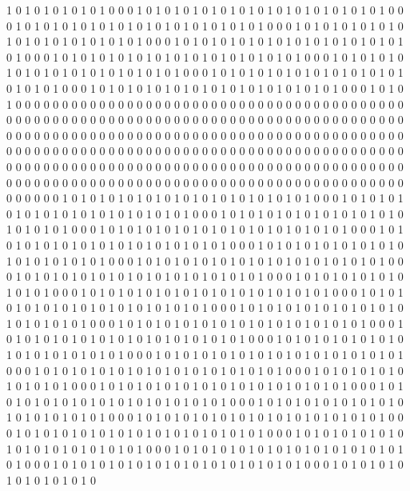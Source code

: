 1 0 1 0 1 0 1 0 1 0 1 0 0 0 1 0 1 0 1 0 1 0 1 0 1 0 1 0 1 0 1 0 1 0 1 0 1 0 1 0 1 0 0 0 1 0 1 0 1 0 1 0 1 0 1 0 1 0 1 0 1 0 1 0 1 0 1 0 1 0 1 0 0 0 1 0 1 0 1 0 1 0 1 0 1 0 1 0 1 0 1 0 1 0 1 0 1 0 1 0 1 0 0 0 1 0 1 0 1 0 1 0 1 0 1 0 1 0 1 0 1 0 1 0 1 0 1 0 1 0 1 0 0 0 1 0 1 0 1 0 1 0 1 0 1 0 1 0 1 0 1 0 1 0 1 0 1 0 1 0 1 0 0 0 1 0 1 0 1 0 1 0 1 0 1 0 1 0 1 0 1 0 1 0 1 0 1 0 1 0 1 0 0 0 1 0 1 0 1 0 1 0 1 0 1 0 1 0 1 0 1 0 1 0 1 0 1 0 1 0 1 0 0 0 1 0 1 0 1 0 1 0 1 0 1 0 1 0 1 0 1 0 1 0 1 0 1 0 1 0 1 0 0 0 1 0 1 0 1 0 
0 0 0 0 0 0 0 0 0 0 0 0 0 0 0 0 0 0 0 0 0 0 0 0 0 0 0 0 0 0 0 0 0 0 0 0 0 0 0 0 0 0 0 0 0 0 0 0 0 0 0 0 0 0 0 0 0 0 0 0 0 0 0 0 0 0 0 0 0 0 0 0 0 0 0 0 0 0 0 0 0 0 0 0 0 0 0 0 0 0 0 0 0 0 0 0 0 0 0 0 0 0 0 0 0 0 0 0 0 0 0 0 0 0 0 0 0 0 0 0 0 0 0 0 0 0 0 0 0 0 0 0 0 0 0 0 0 0 0 0 0 0 0 0 0 0 0 0 0 0 0 0 0 0 0 0 0 0 0 0 0 0 0 0 0 0 0 0 0 0 0 0 0 0 0 0 0 0 0 0 0 0 0 0 0 0 0 0 0 0 0 0 0 0 0 0 0 0 0 0 0 0 0 0 0 0 0 0 0 0 0 0 0 0 0 0 0 0 0 0 0 0 0 0 0 0 0 0 0 0 0 0 0 0 0 0 0 0 0 0 0 0 0 0 0 0 0 0 0 0 0 0 0 0 0 0 0 0 0 0 
0 0 1 0 1 0 1 0 1 0 1 0 1 0 1 0 1 0 1 0 1 0 1 0 1 0 1 0 1 0 0 0 1 0 1 0 1 0 1 0 1 0 1 0 1 0 1 0 1 0 1 0 1 0 1 0 1 0 1 0 0 0 1 0 1 0 1 0 1 0 1 0 1 0 1 0 1 0 1 0 1 0 1 0 1 0 1 0 1 0 0 0 1 0 1 0 1 0 1 0 1 0 1 0 1 0 1 0 1 0 1 0 1 0 1 0 1 0 1 0 0 0 1 0 1 0 1 0 1 0 1 0 1 0 1 0 1 0 1 0 1 0 1 0 1 0 1 0 1 0 0 0 1 0 1 0 1 0 1 0 1 0 1 0 1 0 1 0 1 0 1 0 1 0 1 0 1 0 1 0 0 0 1 0 1 0 1 0 1 0 1 0 1 0 1 0 1 0 1 0 1 0 1 0 1 0 1 0 1 0 0 0 1 0 1 0 1 0 1 0 1 0 1 0 1 0 1 0 1 0 1 0 1 0 1 0 1 0 1 0 0 0 1 0 1 0 1 0 1 0 1 0 1 0 1 0 1 0 1 0 
0 0 1 0 1 0 1 0 1 0 1 0 1 0 1 0 1 0 1 0 1 0 1 0 1 0 1 0 1 0 0 0 1 0 1 0 1 0 1 0 1 0 1 0 1 0 1 0 1 0 1 0 1 0 1 0 1 0 1 0 0 0 1 0 1 0 1 0 1 0 1 0 1 0 1 0 1 0 1 0 1 0 1 0 1 0 1 0 1 0 0 0 1 0 1 0 1 0 1 0 1 0 1 0 1 0 1 0 1 0 1 0 1 0 1 0 1 0 1 0 0 0 1 0 1 0 1 0 1 0 1 0 1 0 1 0 1 0 1 0 1 0 1 0 1 0 1 0 1 0 0 0 1 0 1 0 1 0 1 0 1 0 1 0 1 0 1 0 1 0 1 0 1 0 1 0 1 0 1 0 0 0 1 0 1 0 1 0 1 0 1 0 1 0 1 0 1 0 1 0 1 0 1 0 1 0 1 0 1 0 0 0 1 0 1 0 1 0 1 0 1 0 1 0 1 0 1 0 1 0 1 0 1 0 1 0 1 0 1 0 0 0 1 0 1 0 1 0 1 0 1 0 1 0 1 0 1 0 1 0 
0 0 1 0 1 0 1 0 1 0 1 0 1 0 1 0 1 0 1 0 1 0 1 0 1 0 1 0 1 0 0 0 1 0 1 0 1 0 1 0 1 0 1 0 1 0 1 0 1 0 1 0 1 0 1 0 1 0 1 0 0 0 1 0 1 0 1 0 1 0 1 0 1 0 1 0 1 0 1 0 1 0 1 0 1 0 1 0 1 0 0 0 1 0 1 0 1 0 1 0 1 0 1 0 1 0 1 0 1 0 1 0 1 0 1 0 1 0 1 0 0 0 1 0 1 0 1 0 1 0 1 0 1 0 1 0 1 0 1 0 1 0 1 0 1 0 1 0 1 0 0 0 1 0 1 0 1 0 1 0 1 0 1 0 1 0 1 0 1 0 1 0 1 0 1 0 1 0 1 0 0 0 1 0 1 0 1 0 1 0 1 0 1 0 1 0 1 0 1 0 1 0 1 0 1 0 1 0 1 0 0 0 1 0 1 0 1 0 1 0 1 0 1 0 1 0 1 0 1 0 1 0 1 0 1 0 1 0 1 0 0 0 1 0 1 0 1 0 1 0 1 0 1 0 1 0 1 0 1 0 

